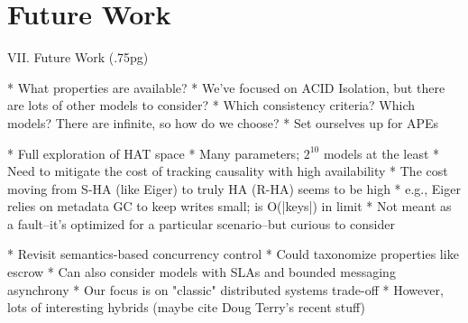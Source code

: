 
\section{Future Work}

VII. Future Work (.75pg)

* What properties are available?
	* We've focused on ACID Isolation, but there are lots of other models to consider?
	* Which consistency criteria? Which models? There are infinite, so how do we choose?
	* Set ourselves up for APEs

* Full exploration of HAT space
	* Many parameters; $2^10$ models at the least
	* Need to mitigate the cost of tracking causality with high availability
		* The cost moving from S-HA (like Eiger) to truly HA (R-HA) seems to be high
		* e.g., Eiger relies on metadata GC to keep writes small; is O(|keys|) in limit
			* Not meant as a fault--it's optimized for a particular scenario--but curious to consider

* Revisit semantics-based concurrency control
	* Could taxonomize properties like escrow
	* Can also consider models with SLAs and bounded messaging asynchrony
	* Our focus is on "classic" distributed systems trade-off
		* However, lots of interesting hybrids (maybe cite Doug Terry's recent stuff)

